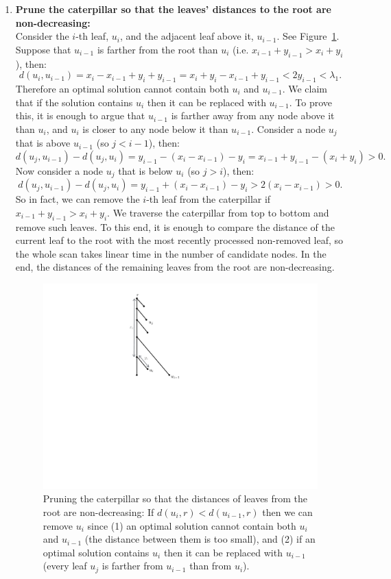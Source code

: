 \documentclass[11pt,a4paper]{article}
\theoremstyle{definition}
\theoremstyle{remark}
\begin{document}
\begin{enumerate}
\item\label{making distances from the root monotone}
\textbf{Prune the caterpillar so that the leaves' distances to the root are non-decreasing:}\\
Consider the $i$-th leaf, $u_i$, and the adjacent leaf above it, $u_{i-1}$. See Figure~\ref{fig:pruning}. Suppose that $u_{i-1}$ is farther from the root than $u_i$ (i.e. $x_{i-1}+y_{i-1} > x_i+y_i$), then:
$$ d(u_{i},u_{i-1}) = x_i-x_{i-1}+y_i+y_{i-1} = x_{i} + y_{i} - x_{i-1} + y_{i-1} < 2y_{i-1} < \lambda_1.$$
Therefore an optimal solution cannot contain both $u_{i}$ and $u_{i-1}$. We claim that if the solution contains
$u_{i}$ then it can be replaced with $u_{i-1}$. To prove this, it is enough to argue that
$u_{i-1}$ is farther away from any node above it than $u_i$, and $u_i$ is closer to any node below it than $u_{i-1}$.
Consider a node $u_{j}$ that is above $u_{i-1}$ (so $j<i-1$), then:
$$d(u_j,u_{i-1}) - d(u_j,u_{i}) = y_{i-1}-(x_i-x_{i-1})-y_i = x_{i-1}+y_{i-1}-(x_i+y_i) > 0.$$
Now consider a node $u_{j}$ that is below $u_{i}$ (so $j>i$), then:
$$d(u_j,u_{i-1}) - d(u_j,u_{i}) = y_{i-1}+(x_i-x_{i-1})-y_i > 2(x_i-x_{i-1}) > 0.$$
So in fact, we can remove the $i$-th leaf from the caterpillar if $x_{i-1}+y_{i-1} > x_i+y_i$. 
We traverse the caterpillar from top to bottom and remove such leaves.
To this end, it is enough to compare the distance of the current leaf to the root with the most recently processed non-removed leaf,
so the whole scan takes linear time in the number of candidate nodes. In the end, the distances of the
remaining leaves from the root are non-decreasing.

\begin{figure}
\begin{center}
\includegraphics[scale=0.45]{caterpillar}
\end{center}
\caption{Pruning the caterpillar so that the distances of leaves from the root are non-decreasing: If $d(u_i,r)<d(u_{i-1},r)$ then  we can remove $u_{i}$ since (1) an optimal solution cannot contain both $u_{i}$ and $u_{i-1}$ (the distance between them is too small), and (2) if an optimal solution contains $u_{i}$ then it can be replaced with $u_{i-1}$ (every leaf $u_j$ is farther from $u_{i-1}$ than from $u_i$). \label{fig:pruning}}
\end{figure}


\end{enumerate}
\end{document}
